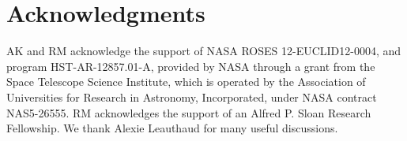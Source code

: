\documentclass[twocolumn,useAMS,usenatbib]{mn2e}
\begin{document}
\section*{Acknowledgments}

AK and RM acknowledge the support of NASA ROSES 12-EUCLID12-0004, and
program HST-AR-12857.01-A, provided by NASA through a grant from the
Space Telescope Science Institute, which is operated by the
Association of Universities for Research in Astronomy, Incorporated,
under NASA contract NAS5-26555. RM acknowledges the support of an Alfred P. Sloan Research Fellowship.  We thank Alexie Leauthaud for 
many useful discussions.



\end{document}
